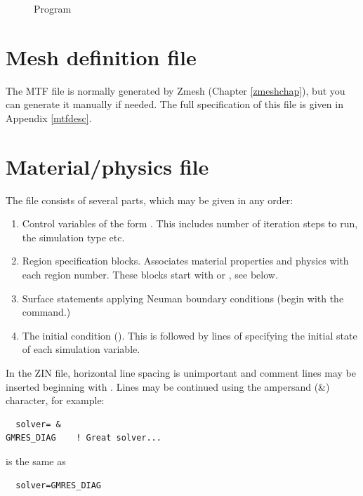 \documentclass[a4paper,twoside,11pt]{book}
\begin{document}
\begin{figure}
  \caption{Program \zinc}
  \label{zincpic}
\end{figure}

\section{Mesh definition file }
\label{mtf}

The MTF file is normally generated by Zmesh (Chapter \ref{zmeshchap}), but you
can generate it manually if needed. The full specification of this
file is given in Appendix \ref{mtfdesc}.

\section{Material/physics file }
\label{zincini}
The file consists of several parts, which may be given in any order:
\begin{enumerate}
\item Control variables of the form . This
  includes number of iteration steps to run, the simulation type etc.
\item Region specification blocks. Associates material properties and
  physics with each region number. These blocks start with  or , see below.
\item Surface statements applying Neuman boundary conditions (begin
  with the  command.)
\item The initial condition (). This is followed by
   lines of specifying the initial state of each simulation
  variable.
\end{enumerate}

In the ZIN file, horizontal line spacing is
unimportant and comment lines may be inserted beginning with
\var{!}. Lines may be continued using the ampersand (\&)
character, for example:
\begin{verbatim}
  solver= &
GMRES_DIAG    ! Great solver...
\end{verbatim}
is the same as
\begin{verbatim}
  solver=GMRES_DIAG
\end{verbatim}
\end{document}
